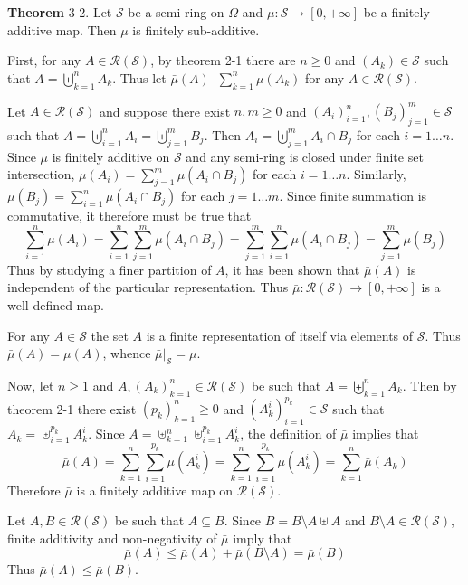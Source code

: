 \documentclass[a4paper]{article}
\newcommand{\clo}[1]{\left [ #1 \right ]}
\newcommand{\brac}[1]{\left ( #1 \right )}
\newcommand{\induc}[1]{\left . #1 \right \vert}
\newcommand{\Zinf}{\clo{ 0, +\infty }}
\newcommand{\Scal}{\mathcal{S}}
\newcommand{\Ring}[1]{\mathcal{R}\brac{#1}}
\newcommand{\defn}{\mathop{\overset{\Delta}{=}}\nolimits}
\begin{document}
\label{thm:fin_add_is_fin_sub_add} \noindent \textbf{Theorem} 3-2.
Let $\Scal$ be a semi-ring on $\Omega$ and $\mu:\Scal\to\Zinf$ be a finitely additive map. Then $\mu$ is finitely sub-additive.

First, for any $A\in \Ring{\Scal}$, by theorem 2-1 there are $n\geq0$ and $\brac{A_k}\in \Scal$ such that $A=\biguplus_{k=1}^n A_k$. Thus let $\bar{\mu}\brac{A}\defn \sum_{k=1}^n \mu\brac{A_k}$ for any $A\in \Ring{\Scal}$.

Let $A\in \Ring{\Scal}$ and suppose there exist $n,m\geq 0$ and $\brac{A_i}_{i=1}^n, \brac{B_j}_{j=1}^m\in \Scal$ such that $A = \biguplus_{i=1}^n A_i = \biguplus_{j=1}^m B_j$. Then $A_i = \biguplus_{j=1}^m A_i\cap B_j$ for each $i=1\ldots n$. Since $\mu$ is finitely additive on $\Scal$ and any semi-ring is closed under finite set intersection, $\mu\brac{A_i}=\sum_{j=1}^m \mu\brac{A_i\cap B_j}$ for each $i=1\ldots n$. Similarly, $\mu\brac{B_j}=\sum_{i=1}^n \mu\brac{A_i\cap B_j}$ for each $j=1\ldots m$. Since finite summation is commutative, it therefore must be true that \[\sum_{i=1}^n \mu\brac{A_i} = \sum_{i=1}^n \sum_{j=1}^m \mu\brac{A_i\cap B_j} = \sum_{j=1}^m \sum_{i=1}^n \mu\brac{A_i\cap B_j} = \sum_{j=1}^m\mu\brac{B_j}\] Thus by studying a finer partition of $A$, it has been shown that $\bar{\mu}\brac{A}$ is independent of the particular representation. Thus $\bar{\mu}:\Ring{\Scal}\to\Zinf$ is a well defined map.

For any $A\in \Scal$ the set $A$ is a finite representation of itself via elements of $\Scal$. Thus $\bar{\mu}\brac{A} = \mu\brac{A}$, whence $\induc{\bar{\mu}}_{\Scal} = \mu$.

Now, let $n\geq1$ and $A,\brac{A_k}_{k=1}^n\in \Ring{\Scal}$ be such that $A=\biguplus_{k=1}^n A_k$. Then by theorem 2-1 there exist $\brac{p_k}_{k=1}^n \geq 0$ and $\brac{A_k^i}_{i=1}^{p_k}\in \Scal$ such that $A_k = \uplus_{i=1}^{p_k} A_k^i$. Since $A=\uplus_{k=1}^n \uplus_{i=1}^{p_k} A_k^i$, the definition of $\bar{\mu}$ implies that \[\bar{\mu}\brac{A} = \sum_{k=1}^n \sum_{i=1}^{p_k} \mu\brac{A_k^i} = \sum_{k=1}^n \sum_{i=1}^{p_k} \mu\brac{A_k^i} = \sum_{k=1}^n \bar{\mu}\brac{A_k}\] Therefore $\bar{\mu}$ is a finitely additive map on $\Ring{\Scal}$.

Let $A,B\in \Ring{\Scal}$ be such that $A\subseteq B$. Since $B=B\setminus A \uplus A$ and $B\setminus A\in \Ring{\Scal}$, finite additivity and non-negativity of $\bar{\mu}$ imply that \[\bar{\mu}\brac{A}\leq \bar{\mu}\brac{A}+\bar{\mu}\brac{B\setminus A} = \bar{\mu}\brac{B}\] Thus $\bar{\mu}\brac{A}\leq\bar{\mu}\brac{B}$.
\end{document}
